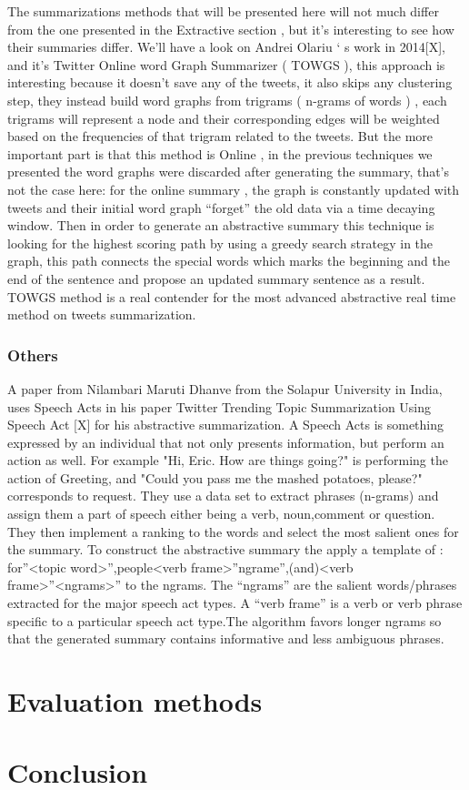 \documentclass[a4paper, twocolumn]{article}
\begin{document}
The summarizations methods that will be presented here will not much differ
from the one presented in the Extractive section , but it’s interesting to see
how their summaries differ. We’ll have a look on Andrei Olariu ‘ s work in
2014[X], and it’s Twitter Online word Graph Summarizer ( TOWGS ), this approach
is interesting because it doesn’t save any of the tweets, it also skips any
clustering step, they instead build word graphs from trigrams ( n-grams of
words )  , each trigrams will represent a node and their corresponding edges
will be weighted based on the frequencies of that trigram related to the
tweets. But the more important part is that this method is Online , in the
previous techniques we presented the word graphs were discarded after
generating the summary, that’s not the case here: for the online summary , the
graph is constantly updated with tweets and their initial word graph “forget”
the old data via a time decaying window. Then in order to generate an
abstractive summary this technique is looking for the highest scoring path by
using a greedy search strategy  in the graph, this path connects the special
words which marks the beginning and the end of the sentence and propose an
updated summary sentence as a result. TOWGS method is a real contender for the
most advanced abstractive real time method on tweets summarization.

\subsubsection{Others}

A paper from Nilambari Maruti Dhanve from the Solapur University in India, uses
Speech Acts in his paper Twitter Trending Topic Summarization Using Speech Act
[X]  for his abstractive summarization. A Speech Acts is something expressed by
an individual that not only presents information, but perform an action as
well. For example "Hi, Eric. How are things going?" is performing the action of
Greeting, and "Could you pass me the mashed potatoes, please?" corresponds to
request.  They use a data set to extract phrases (n-grams) and assign them a
part of speech either being a verb, noun,comment or question. They then
implement a ranking to the words and select the most salient ones for the
summary. To construct the abstractive summary the apply a template of :
for”<topic word>”,people<verb frame>”ngrame”{,(and)<verb frame>”<ngrams>”} to
the ngrams.  The “ngrams” are the salient words/phrases extracted for the major
speech act types. A “verb frame” is a verb or verb phrase specific to a
particular speech act type.The  algorithm  favors longer ngrams so that the
generated summary contains informative and less ambiguous phrases.

\section{Evaluation methods}

\section{Conclusion}



\end{document}
